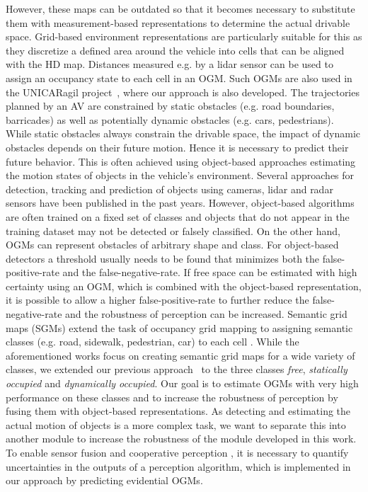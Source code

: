 \documentclass[conference]{IEEEtran}
\begin{document}
However, these maps can be outdated so that it becomes necessary to substitute them with measurement-based representations to determine the actual drivable space. Grid-based environment representations are particularly suitable for this as they discretize a defined area around the vehicle into cells that can be aligned with the HD map. Distances measured e.g. by a lidar sensor can be used to assign an occupancy state to each cell in an OGM. Such OGMs are also used in the UNICARagil project~\cite{Buchholz.2020, Woopen.2018}, where our approach is also developed. The trajectories planned by an AV are constrained by static obstacles (e.g. road boundaries, barricades) as well as potentially dynamic obstacles (e.g. cars, pedestrians). While static obstacles always constrain the drivable space, the impact of dynamic obstacles depends on their future motion. Hence it is necessary to predict their future behavior. This is often achieved using object-based approaches estimating the motion states of objects in the vehicle's environment. Several approaches for detection, tracking and prediction of objects using cameras, lidar and radar sensors have been published in the past years. However, object-based algorithms are often trained on a fixed set of classes and objects that do not appear in the training dataset may not be detected or falsely classified. On the other hand, OGMs can represent obstacles of arbitrary shape and class. For object-based detectors a threshold usually needs to be found that minimizes both the false-positive-rate and the false-negative-rate. If free space can be estimated with high certainty using an OGM, which is combined with the object-based representation, it is possible to allow a higher false-positive-rate to further reduce the false-negative-rate and the robustness of perception can be increased. Semantic grid maps (SGMs) extend the task of occupancy grid mapping to assigning semantic classes (e.g. road, sidewalk, pedestrian, car) to each cell \cite{Bieder.2020, Richter.2020}. While the aforementioned works focus on creating semantic grid maps for a wide variety of classes, we extended our previous approach~\cite{vanKempen.2021b} to the three classes \textit{free}, \textit{statically occupied} and \textit{dynamically occupied}. Our goal is to estimate OGMs with very high performance on these classes and to increase the robustness of perception by fusing them with object-based representations. As detecting and estimating the actual motion of objects is a more complex task, we want to separate this into another module to increase the robustness of the module developed in this work. To enable sensor fusion and cooperative perception \cite{Lampe.2020}, it is necessary to quantify uncertainties in the outputs of a perception algorithm, which is implemented in our approach by predicting evidential OGMs.
\end{document}
